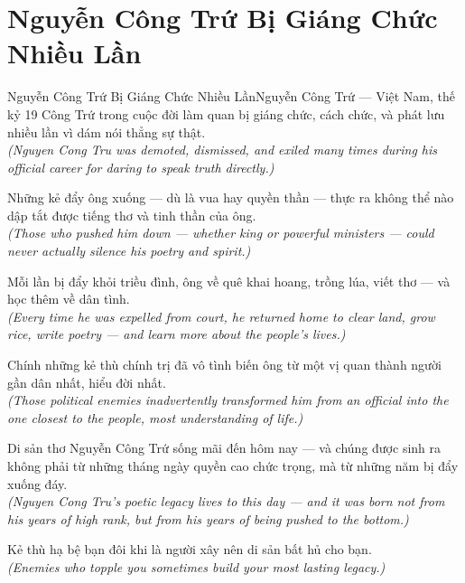 \section{Nguyễn Công Trứ Bị Giáng Chức Nhiều Lần}
\begin{truyen}{Nguyễn Công Trứ Bị Giáng Chức Nhiều Lần}{Nguyễn Công Trứ --- Việt Nam, thế kỷ 19}
 Công Trứ trong cuộc đời làm quan bị giáng chức, cách chức, và phát lưu nhiều lần vì dám nói thẳng sự thật.\\[4pt]
\textit{(Nguyen Cong Tru was demoted, dismissed, and exiled many times during his official career for daring to speak truth directly.)}

Những kẻ đẩy ông xuống --- dù là vua hay quyền thần --- thực ra không thể nào dập tắt được tiếng thơ và tinh thần của ông.\\[4pt]
\textit{(Those who pushed him down --- whether king or powerful ministers --- could never actually silence his poetry and spirit.)}

Mỗi lần bị đẩy khỏi triều đình, ông về quê khai hoang, trồng lúa, viết thơ --- và học thêm về dân tình.\\[4pt]
\textit{(Every time he was expelled from court, he returned home to clear land, grow rice, write poetry --- and learn more about the people's lives.)}

Chính những kẻ thù chính trị đã vô tình biến ông từ một vị quan thành người gần dân nhất, hiểu đời nhất.\\[4pt]
\textit{(Those political enemies inadvertently transformed him from an official into the one closest to the people, most understanding of life.)}

Di sản thơ Nguyễn Công Trứ sống mãi đến hôm nay --- và chúng được sinh ra không phải từ những tháng ngày quyền cao chức trọng, mà từ những năm bị đẩy xuống đáy.\\[4pt]
\textit{(Nguyen Cong Tru's poetic legacy lives to this day --- and it was born not from his years of high rank, but from his years of being pushed to the bottom.)}

\end{truyen}
\begin{baihoc}
  Kẻ thù hạ bệ bạn đôi khi là người xây nên di sản bất hủ cho bạn.\\[4pt]
  \textit{(Enemies who topple you sometimes build your most lasting legacy.)}
\end{baihoc}

